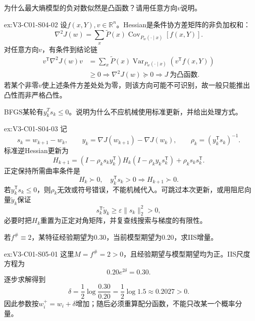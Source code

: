 \begin{SLChapterExercisePairSection}
\begin{exercise}\label{ex:V3-C01-S04-02}
为什么最大熵模型的负对数似然是凸函数？请用任意方向$v$说明。
\end{exercise}
\ifSLFullEdition
{}\label{sol:V3-C01-S04-02}
\begin{chapterexercisesolution}{ex:V3-C01-S04-02}
设$f(x,Y),v\in\mathbb R^n$。Hessian是条件协方差矩阵的非负加权和：
\[
\nabla^2J(w)
=\sum_x\widetilde P(x)\operatorname{Cov}_{P_w(\cdot\mid x)}[f(x,Y)].
\]
对任意方向$v$，有条件到结论链
\[
\begin{aligned}
v^{\mathsf T}\nabla^2J(w)v
&=\sum_x\widetilde P(x)
\operatorname{Var}_{P_w(\cdot\mid x)}\!\left(v^{\mathsf T}f(x,Y)\right)\\
&\geq0
\Longrightarrow \nabla^2J(w)\succeq0
\Longrightarrow J\ \text{为凸函数}.
\end{aligned}
\]
若某个非零$v$使上述条件方差处处为零，则该方向可能不可识别，故一般只能推出凸性而非严格凸性。
\end{chapterexercisesolution}
\fi

\begin{exercise}\label{ex:V3-C01-S04-03}
BFGS某轮有$y_k^Ts_k\leq0$。说明为什么不应机械使用标准更新，并给出处理方式。
\end{exercise}
\ifSLFullEdition
{}\label{sol:V3-C01-S04-03}
\begin{chapterexercisesolution}{ex:V3-C01-S04-03}
记
\[
s_k=w_{k+1}-w_k,
\qquad
y_k=\nabla J(w_{k+1})-\nabla J(w_k),
\qquad
\rho_k=(y_k^{\mathsf T}s_k)^{-1}.
\]
标准逆Hessian更新为
\[
H_{k+1}=(I-\rho_ks_ky_k^{\mathsf T})H_k
(I-\rho_ky_ks_k^{\mathsf T})+\rho_ks_ks_k^{\mathsf T}.
\]
正定保持所需曲率条件是
\[
H_k\succ0,\quad y_k^{\mathsf T}s_k>0
\Longrightarrow H_{k+1}\succ0.
\]
若$y_k^{\mathsf T}s_k\leq0$，则$\rho_k$无效或符号错误，不能机械代入。可跳过本次更新，或用阻尼向量$\widetilde y_k$保证
\[
s_k^{\mathsf T}\widetilde y_k\geq\varepsilon\lVert s_k\rVert_2^2>0,
\]
必要时把$H_k$重置为正定对角矩阵，并复查线搜索与梯度的有限性。
\end{chapterexercisesolution}
\fi

\begin{exercise}\label{ex:V3-C01-S05-01}
若$f^\#\equiv2$，某特征经验期望为$0.30$，当前模型期望为$0.20$，求IIS增量。
\end{exercise}
\ifSLFullEdition
{}\label{sol:V3-C01-S05-01}
\begin{chapterexercisesolution}{ex:V3-C01-S05-01}
这里$M=f^\#=2>0$，且经验期望与模型期望均为正。IIS尺度方程为
\[
0.20e^{2\delta}=0.30.
\]
逐步求解得到
\[
\delta
=\frac12\log\frac{0.30}{0.20}
=\frac12\log1.5
\approx0.2027>0.
\]
因此参数按$w_i^+=w_i+\delta$增加；随后必须重算配分函数，不能只改某一个概率分量。
\end{chapterexercisesolution}
\fi


\end{SLChapterExercisePairSection}
